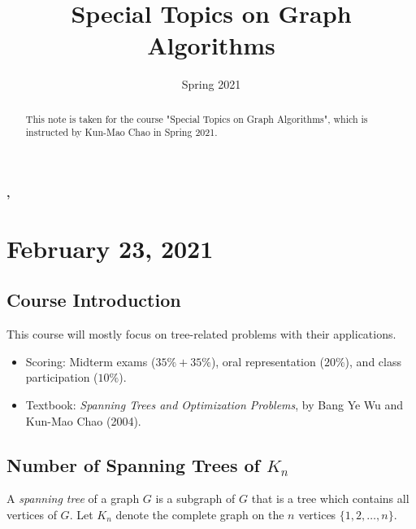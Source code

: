 \documentclass[11pt]{article}
\title{Special Topics on Graph Algorithms}
\date{Spring 2021}
\begin{document}
\begin{center}
  \LARGE \bfseries \thetitle, \thedate
\end{center}

\begin{abstract}
  This note is taken for the course "Special Topics on Graph Algorithms", which is instructed by Kun-Mao Chao in Spring 2021.
\end{abstract}

\tableofcontents

\section{February 23, 2021}
\subsection{Course Introduction}
This course will mostly focus on tree-related problems with their applications.
\begin{itemize}
  \item Scoring: Midterm exams ($35\%+35\%$), oral representation ($20\%$), and class participation ($10\%$).
  \item Textbook: \textsl{Spanning Trees and Optimization Problems}, by Bang Ye Wu and Kun-Mao Chao (2004).
\end{itemize}

\subsection{Number of Spanning Trees of $K_n$}
A \emph{spanning tree} of a graph $G$ is a subgraph of $G$ that is a tree which contains all vertices of $G$.
Let $K_n$ denote the complete graph on the $n$ vertices $\{1, 2, \dots, n\}$.
\end{document}
